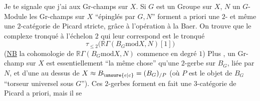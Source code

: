 
Je te signale que j'ai  aux Gr-champs sur $X$. Si $G$ est un Groupe sur $X$, $N$ un $G$-Module les Gr-champs sur $X$ ``épinglés par $G,N$'' forment a priori une $2$- et même une $2$-catégorie de Picard stricte, grâce à l'opération  à la Baer. On trouve que le complexe  tronqué à l'échelon $2$ qui leur correspond est le tronqué
\[
\tau_{\leq 2}\bigl(\mathbb R\Gamma(B_{G}\mathbin{\mathrm{mod}}X,N)[1]\bigr)
\]
(\uline{NB} la cohomologie de $\mathbb R\Gamma(B_{G}\mathbin{\mathrm{mod}}X,N)$ commence en degré $1$) Plus , un Gr-champ sur $X$   est essentiellement ``la même chose'' qu'une $2$-gerbe sur $B_{G}$, liée par $N$, et  d'une  au dessus de $X\approx B_{\unsure{e|c}}=(B_{G})_{/P}$ (où $P$ est le objet de $B_{G}$ ``torseur universel sous $G$''). Ces $2$-gerbes forment en fait une $3$-catégorie de Picard a priori, mais il se

